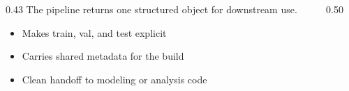 \begin{frame}

  \vspace{14mm}
  \begin{columns}[T,onlytextwidth]
    \begin{column}{0.43\textwidth}
      {\small The pipeline returns one structured object for downstream use.}\par
      \vspace{1.5mm}
      \begin{itemize}
        \item Makes train, val, and test explicit
        \item Carries shared metadata for the build
        \item Clean handoff to modeling or analysis code
      \end{itemize}
    \end{column}
    \begin{column}{0.50\textwidth}
      
    \end{column}
  \end{columns}

  \slideheaderfooter
\end{frame}
